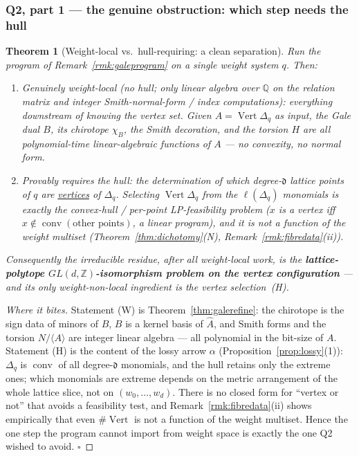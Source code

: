 \documentclass{amsart}
\newtheorem{theorem}{Theorem}[section]
\begin{document}
\subsubsection*{Q2, part 1 --- the genuine obstruction: which step needs the hull}

\begin{theorem}[Weight-local vs.\ hull-requiring: a clean separation]
\label{thm:obstruction}
Run the program of Remark~\ref{rmk:galeprogram} on a single weight system $q$.
Then:
\begin{enumerate}
  \item[\textnormal{(W)}] \emph{Genuinely weight-local} (no hull; only linear
        algebra over $\mathbb Q$ on the relation matrix and integer
        Smith-normal-form / index computations): everything \emph{downstream of
        knowing the vertex set}. Given $A=\operatorname{Vert}\Delta_q$ as input,
        the Gale dual $B$, its chirotope $\chi_B$, the Smith decoration, and the
        torsion $H$ are all polynomial-time linear-algebraic functions of $A$ ---
        no convexity, no normal form.
  \item[\textnormal{(H)}] \emph{Provably requires the hull}: the determination of
        \emph{which} degree-$\mathfrak d$ lattice points of $q$ are
        \underline{vertices} of $\Delta_q$. Selecting $\operatorname{Vert}
        \Delta_q$ from the $\ell(\Delta_q)$ monomials is exactly the
        \emph{convex-hull / per-point LP-feasibility} problem ($x$ is a vertex iff
        $x\notin\operatorname{conv}(\text{other points})$, a linear program), and
        it is not a function of the weight multiset
        (Theorem~\ref{thm:dichotomy}(N), Remark~\ref{rmk:fibredata}(ii)).
\end{enumerate}
Consequently the irreducible residue, after all weight-local work, is the
\textbf{lattice-polytope $GL(d,\mathbb Z)$-isomorphism problem on the
vertex configuration} --- and its only weight-non-local ingredient is the vertex
selection~(H).
\end{theorem}

\begin{proof}[Where it bites]
Statement (W) is Theorem~\ref{thm:galerefine}: the chirotope is the sign data of
minors of $B$, $B$ is a kernel basis of $\widehat A$, and Smith forms and the
torsion $N/\langle A\rangle$ are integer linear algebra --- all polynomial in the
bit-size of $A$. Statement (H) is the content of the lossy arrow $\alpha$
(Proposition~\ref{prop:lossy}(1)): $\Delta_q$ is $\operatorname{conv}$ of all
degree-$\mathfrak d$ monomials, and the hull retains only the extreme ones; which
monomials are extreme depends on the metric arrangement of the whole lattice
slice, not on $(w_0,\dots,w_d)$. There is no closed form for ``vertex or not''
that avoids a feasibility test, and Remark~\ref{rmk:fibredata}(ii) shows
empirically that even $\#\operatorname{Vert}$ is not a function of the weight
multiset. Hence the one step the program cannot import from weight space is
exactly the one Q2 wished to avoid. $\square$
\end{proof}
\end{document}
